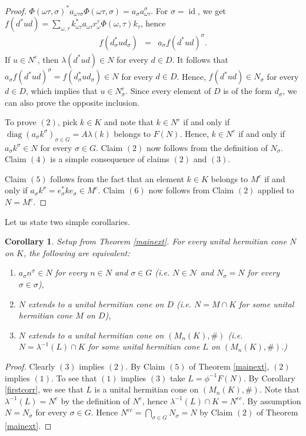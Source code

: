 \documentclass[12pt,reqno]{amsart}
\newtheorem{cor}[thm]{Corollary}
\theoremstyle{definition}
\DeclareMathOperator{\id}{id}
\DeclareMathOperator{\diag}{diag}
\begin{document}
\begin{proof}
$\Phi(\omega \tau,\sigma)^\ast a_{\omega \tau \sigma} \Phi(\omega\tau, \sigma)
= a_\sigma a_{\omega \tau}^\sigma$.
For $\sigma=\id$, we get $f(d^\ast u d) = \sum_{\omega,\tau} k_{\omega \tau}^{\ast} a_{\omega \tau}
 r_\omega^{\tau}  \Phi(\omega,\tau) k_\tau$, hence
\[
\begin{array}{ccl}
f(d_\sigma^\ast u d_\sigma)  
&  = & a_\sigma f(d^\ast u d)^\sigma.
\end{array}
\]
If $u \in N^e$, then $\lambda(d^\ast u d) \in N$ for every $d \in D$. It follows that
$a_\sigma f(d^\ast u d)^\sigma = f(d_\sigma^\ast u d_\sigma)  \in N$ for every $d \in D$.
Hence, $f(d^\ast u d) \in N_\sigma$ for every $d \in D$, which implies that $u \in N_\sigma^e$.
Since every element of $D$ is of the form $d_\sigma$, we can also prove the opposite inclusion.

To prove $(2)$, pick $k \in K$ and note that $k \in N^e$ if and only if 
$\diag(a_\sigma k^\sigma)_{\sigma \in G} = A \lambda(k)$ belongs to $F(N)$.
Hence, $k \in N^e$ if and only if $a_\sigma k^\sigma \in N$ for every $\sigma \in G$.
Claim $(2)$ now follows from the definition of $N_\sigma$. Claim $(4)$ is a simple
consequence of claims $(2)$ and $(3)$.

Claim $(5)$ follows from the fact that an element $k \in K$ belongs to $M^c$
if and only if $a_\sigma k^\sigma = e_\sigma^\ast k e_\sigma \in M^c$. Claim
$(6)$ now follows from Claim $(2)$ applied to $N=M^c$.
\end{proof}

Let us state two simple corollaries.

\begin{cor}
\label{extk}
Setup from Theorem \ref{mainext}. For every unital hermitian cone $N$ on $K$,
the following are equivalent:
\begin{enumerate}
\item $a_\sigma n^\sigma \in N$ for every $n \in N$ and $\sigma \in G$
(i.e. $N \in \mathcal{N}$ and $N_\sigma=N$ for every $\sigma \in \sigma$),
\item $N$ extends to a unital hermitian cone on $D$ (i.e. $N=M \cap K$
for some unital hermitian cone $M$ on $D$),
\item $N$ extends to a unital hermitian cone on $(M_n(K),\#)$ 
(i.e. $N = \lambda^{-1}(L) \cap K$ for some unital hermitian cone $L$ on $(M_n(K),\#)$.)
\end{enumerate}
\end{cor}

\begin{proof} Clearly $(3)$ implies $(2)$. By Claim $(5)$ of Theorem \ref{mainext}, $(2)$ implies $(1)$.
To see that $(1)$ implies $(3)$ take $L=\phi^{-1}F(N)$. By Corollary \ref{firstcorr}, we see that
$L$ is a unital hermitian cone on $(M_n(K),\#)$. Note that $\lambda^{-1}(L) =N^e$ by the definition 
of $N^e$, hence $\lambda^{-1}(L) \cap K=N^{ec}$. By assumption $N=N_\sigma$ for every $\sigma \in G$.
Hence $N^{ec} = \bigcap_{\sigma \in G} N_\sigma = N$ by Claim $(2)$ of Theorem \ref{mainext}.
\end{proof}
\end{document}
